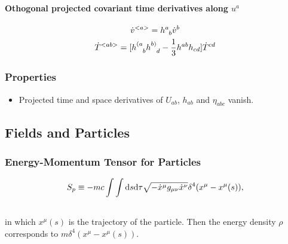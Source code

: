\documentclass[letterpaper,10pt,english]{sphinxmanual}
\begin{document}
{\paragraph{Othogonal projected covariant time derivatives along $u^a$}
\label{GeneralRelativity:othogonal-projected-covariant-time-derivatives-along}\begin{gather}
\begin{split}\dot v^{<a>} = h^a_{\phantom a b} \dot v^b\end{split}\notag\\\begin{split}\dot T^{<ab>} = [ h^{(a}_{\phantom{(a}b} h^{b)}_{\phantom{b)} d} - \frac 1 3 h^{ab}h_{cd} ]\dot T^{cd}\end{split}\notag
\end{gather}

\subsubsection{Properties}
\label{GeneralRelativity:properties}\begin{itemize}
\item {} 
Projected time and space derivatives of $U_{ab}$, $h_{ab}$ and $\eta_{abc}$ vanish.

\end{itemize}


\subsection{Fields and Particles}
\label{GeneralRelativity:fields-and-particles}

\subsubsection{Energy-Momentum Tensor for Particles}
\label{GeneralRelativity:energy-momentum-tensor-for-particles}\begin{gather}
\begin{split}\begin{equation}
S_p \equiv -m c \int \int \mathrm d s\mathrm d\tau \sqrt{-\dot x ^\mu g_{\mu\nu} \dot x^\nu} \delta^4(x^\mu - x^\mu (s))    ,
\end{equation}\end{split}\notag\\\begin{split}\end{split}\notag
\end{gather}
in which $x^\mu(s)$ is the trajectory of the particle. Then the energy density $\rho$ corresponds to $m\delta^4(x^\mu- x^\mu(s))$.

}
\end{document}
